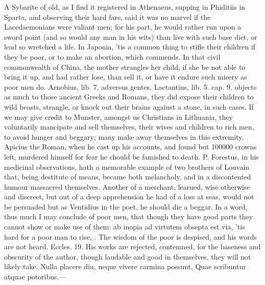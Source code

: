 {A Sybarite of old, as I find it registered in Athenaeus, supping
in Phiditiis in Sparta, and observing their hard fare, said it was no
marvel if the Lacedaemonians were valiant men; for his part, he would
rather run upon a sword point (and so would any man in his wits) than
live with such base diet, or lead so wretched a life. In Japonia,
'tis a common thing to stifle their children if they be poor, or to
make an abortion, which \Aristotle commends. In that civil commonwealth
of China, the mother strangles her child, if she be not able to
bring it up, and had rather lose, than sell it, or have it endure such
misery as poor men do. Arnobius, lib. 7, adversus gentes,
Lactantius, lib. 5. cap. 9. objects as much to those ancient
Greeks and Romans, they did expose their children to wild beasts,
strangle, or knock out their brains against a stone, in such cases. If
we may give credit to Munster, amongst us Christians in
Lithuania, they voluntarily mancipate and sell themselves, their wives
and children to rich men, to avoid hunger and beggary;  many make
away themselves in this extremity. Apicius the Roman, when he cast up
his accounts, and found but 100\thinspace{}000 crowns left, murdered himself for
fear he should be famished to death. P. Forestus, in his medicinal
observations, hath a memorable example of two brothers of Louvain that,
being destitute of means, became both melancholy, and in a discontented
humour massacred themselves. Another of a merchant, learned, wise
otherwise and discreet, but out of a deep apprehension he had of a loss
at seas, would not be persuaded but as Ventidius in the poet, he
should die a beggar. In a word, thus much I may conclude of poor men,
that though they have good parts they cannot show or make use of
them: ab inopia ad virtutem obsepta est via, 'tis hard for a poor
man to  rise, . The wisdom of the poor is despised, and his words
are not heard. Eccles.  19. His works are rejected, contemned, for
the baseness and obscurity of the author, though laudable and good in
themselves, they will not likely take.
Nulla placere diu, neque vivere carmina possunt,
Quae scribuntur atquae potoribus.---

}
